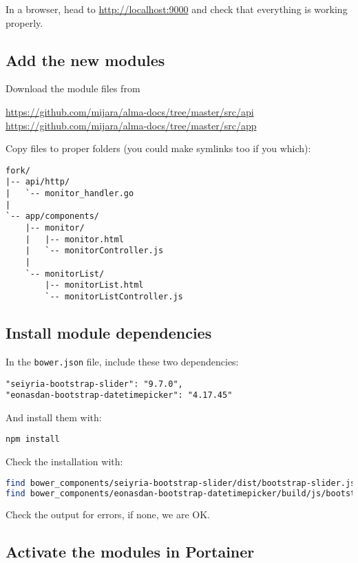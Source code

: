 In a browser, head to \url{http://localhost:9000} and check that everything is working properly.

\subsection{Add the new modules}

Download the module files from

\begin{center}
\url{https://github.com/mijara/alma-docs/tree/master/src/api}
\url{https://github.com/mijara/alma-docs/tree/master/src/app}
\end{center}

Copy files to proper folders (you could make symlinks too if you which):

\begin{lstlisting}
fork/
|-- api/http/
|   `-- monitor_handler.go
|
`-- app/components/
    |-- monitor/
    |   |-- monitor.html
    |   `-- monitorController.js
    |
    `-- monitorList/
        |-- monitorList.html
        `-- monitorListController.js
\end{lstlisting}

\subsection{Install module dependencies}

In the \texttt{bower.json} file, include these two dependencies:

\begin{lstlisting}
"seiyria-bootstrap-slider": "9.7.0",
"eonasdan-bootstrap-datetimepicker": "4.17.45"
\end{lstlisting}

And install them with:

\begin{lstlisting}
npm install
\end{lstlisting}

Check the installation with:

\begin{lstlisting}[language=bash]
find bower_components/seiyria-bootstrap-slider/dist/bootstrap-slider.js
find bower_components/eonasdan-bootstrap-datetimepicker/build/js/bootstrap-datetimepicker.min.js
\end{lstlisting}

Check the output for errors, if none, we are OK.

\subsection{Activate the modules in Portainer}

